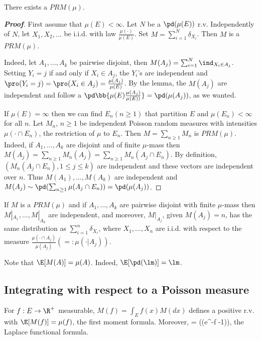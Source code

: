 \begin{proposition}
There exists a $PRM(\mu)$.
\end{proposition}

\begin{proof}[\bf Proof]
First assume that $\mu(E) < \infty$. Let $N$ be a $\pd(\mu(E))$ r.v. Independently of $N$, let $X_1, X_2, \dots$ be i.i.d. with law $\frac{\mu(\cdot)}{\mu(E)}$. Set $M = \sum^N_{i=1} \delta_{X_i}$. Then $M$ is a $PRM(\mu)$.

Indeed, let $A_1, \dots,A_k$ be pairwise disjoint, then $M(A_j) = \sum^N_{i=1} \ind_{X_i\in A_j}$. Setting $Y_i = j$ if and only if $X_i \in A_j$, the $Y_i$'s are independent and $\pro(Y_i = j) = \pro(X_i \in A_j) = \frac{\mu(A_j )}{\mu(E)}$. By the lemma, the $M(A_j)$ are independent and follow a $\pd\bb{\mu(E) \frac{\mu(A_j )}{\mu(E) )}} = \pd(\mu(A_j))$, as we wanted.

If $\mu(E) =\infty$ then we can find $E_n (n \geq 1)$ that partition $E$ and $\mu(E_n) <\infty$ for all $n$. Let $M_n$, $n \geq 1$ be independent Poisson random measures with intensities $\mu(\cdot \cap E_n)$, the restriction of $\mu$ to $E_n$. Then $M = \sum_{n\geq 1} M_n$ is $PRM(\mu)$. Indeed, if $A_1,\dots,A_k$ are disjoint and of finite $\mu$-mass then $M(A_j) = \sum_{n\geq1} M_n(A_j) = \sum_{n\geq1} M_n(A_j \cap E_n)$. By definition, $(M_n(A_j \cap E_n), 1 \leq j \leq k)$ are independent and these vectors are independent over $n$. Thus $M(A_1),\dots,M(A_k)$ are independent and $M(A_j) \sim \pd(
\sum_{n\geq1} \mu(A_j \cap E_n)) = \pd (\mu(A_j))$.
\end{proof}

\begin{corollary}
If $M$ is a $PRM(\mu)$ and if $A_1,\dots,A_k$ are pairwise disjoint with finite $\mu$-mass then $M|_{A_1} ,\dots,M|_{A_k}$ are independent, and moreover, $M|_{A_j}$, given $M(A_j) = n$, has the same distribution as $\sum^n_{i=1} \delta_{X_i}$, where $X_1,\dots, X_n$ are i.i.d. with respect to the measure $\frac{\mu(\cdot\cap A_j )}{\mu(A_j )} (=: \mu(\cdot | A_j))$.
\end{corollary}

Note that $\E[M(A)] = \mu(A)$. Indeed, $\E[\pd(\lm)] = \lm$.

\subsection{Integrating with respect to a Poisson measure}


\begin{proposition}
For $f : E \to \R^+$ measurable, $M( f ) = \int_E f (x)M(d x)$ defines a positive r.v. with $\E[M( f )] = \mu( f )$, the first moment formula. Moreover,
\be
\E[e^{-M( f )}] = \exp(\mu(e^{-f} -1)),
\ee
the Laplace functional formula.
\end{proposition}

